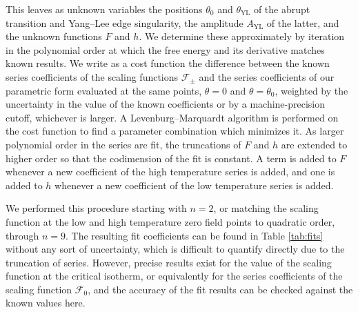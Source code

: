 \documentclass[
  aps,
  pre,
  preprint,
  longbibliography,
  floatfix
]{revtex4-2}
\begin{document}
This leaves as unknown variables the positions $\theta_0$ and
$\theta_{\mathrm{YL}}$ of the abrupt transition and Yang--Lee edge singularity,
the amplitude $A_\mathrm{YL}$ of the latter, and the unknown functions $F$ and
$h$. We determine these approximately by iteration in the polynomial order at
which the free energy and its derivative matches known results. We write as a
cost function the difference between the known series coefficients of the
scaling functions $\mathcal F_\pm$ and the series coefficients of our
parametric form evaluated at the same points, $\theta=0$ and $\theta=\theta_0$,
weighted by the uncertainty in the value of the known coefficients or by a
machine-precision cutoff, whichever is larger. A Levenburg--Marquardt algorithm
is performed on the cost function to find a parameter combination which
minimizes it. As larger polynomial order in the series are fit, the truncations
of $F$ and $h$ are extended to higher order so that the codimension of the fit
is constant. A term is added to $F$ whenever a new coefficient of the high
temperature series is added, and one is added to $h$ whenever a new coefficient
of the low temperature series is added.

We performed this procedure starting with $n=2$, or matching the scaling
function at the low and high temperature zero field points to quadratic order,
through $n=9$. The resulting fit coefficients can be found in Table
\ref{tab:fits} without any sort of uncertainty, which is difficult to quantify
directly due to the truncation of series. However, precise results exist for
the value of the scaling function at the critical isotherm, or equivalently for
the series coefficients of the scaling function $\mathcal F_0$, and the
accuracy of the fit results can be checked against the known values here.
\end{document}
